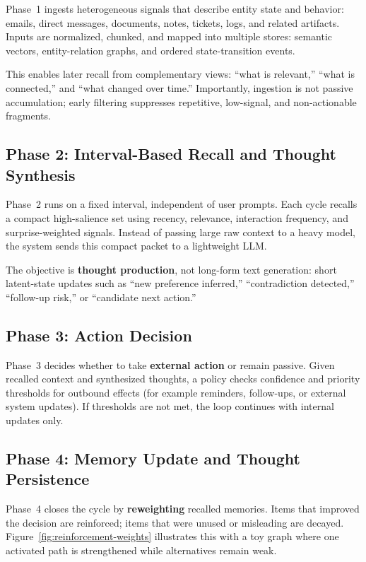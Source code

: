 \documentclass{article}
\begin{document}
Phase~1 ingests heterogeneous signals that describe entity state and behavior:
emails, direct messages, documents, notes, tickets, logs, and related
artifacts. Inputs are normalized, chunked, and mapped into multiple stores:
semantic vectors, entity-relation graphs, and ordered state-transition events.

This enables later recall from complementary views:
``what is relevant,'' ``what is connected,'' and ``what changed over time.''
Importantly, ingestion is not passive accumulation; early filtering suppresses
repetitive, low-signal, and non-actionable fragments.

\subsection{Phase 2: Interval-Based Recall and Thought Synthesis}

Phase~2 runs on a fixed interval, independent of user prompts. Each cycle
recalls a compact high-salience set using recency, relevance, interaction
frequency, and surprise-weighted signals. Instead of passing large raw context
to a heavy model, the system sends this compact packet to a lightweight LLM.

The objective is \textbf{thought production}, not long-form text generation:
short latent-state updates such as ``new preference inferred,''
``contradiction detected,'' ``follow-up risk,'' or ``candidate next action.''

\subsection{Phase 3: Action Decision}

Phase~3 decides whether to take \textbf{external action} or remain passive.
Given recalled context and synthesized thoughts, a policy checks confidence and
priority thresholds for outbound effects (for example reminders, follow-ups,
or external system updates). If thresholds are not met, the loop continues
with internal updates only.

\subsection{Phase 4: Memory Update and Thought Persistence}

Phase~4 closes the cycle by \textbf{reweighting} recalled memories. Items that
improved the decision are reinforced; items that were unused or misleading are
decayed. Figure~\ref{fig:reinforcement-weights} illustrates this with a toy
graph where one activated path is strengthened while alternatives remain weak.
\end{document}
